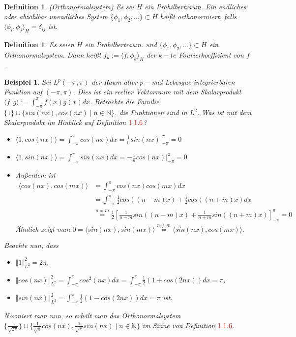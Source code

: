 \documentclass[12pt,titlepage]{article}
\newtheorem{definition}[zahl]{Definition}
\newtheorem{bsp}[zahl]{Beispiel}
\numberwithin{equation}{section}
\begin{document}
\begin{definition}{(Orthonormalsystem)}
Es sei $H$ ein Prähilbertraum. Ein endliches oder abzählbar unendliches System $\{\phi_1,\phi_2,\ldots\}\subset H$ heißt orthonormiert, falls $\langle \phi_i,\phi_j \rangle_H= \delta_{ij}$ ist.
\end{definition}
\begin{definition}
Es seien $H$ ein Prähilbertraum. und $\{\phi_1,\phi_2,\ldots\}\subset H$ ein Orthonormalsystem. Dann heißt $f_k:=\langle f, \phi_k\rangle_H$ der $k-te$ Fourierkoeffizient von $f$.
\end{definition}
 \begin{bsp}
 Sei $L^p(-\pi, \pi)$ der Raum aller $p-$mal Lebesgue-integrierbaren Funktion auf $(-\pi,\pi)$. Dies ist ein reeller Vektorraum mit dem Skalarprodukt $\langle f, g\rangle:=\int_{-\pi}^\pi f(x)g(x)dx$. Betrachte die Familie
 $\{1\} \cup \{sin(nx),cos(nx)\mid n \in \mathbb{N}\}$. die Funktionen sind in $L^2$. Was ist mit dem Skalarprodukt im Hinblick auf Definition $\textcolor{red}{1.1.6}$?
 \begin{itemize}
 \item $\langle 1,cos(nx) \rangle=\int_{-\pi}^\pi cos(nx)dx=\frac{1}{n}sin(nx)|_{-\pi}^\pi=0$
 \item $\langle 1,sin(nx) \rangle=\int_{-\pi}^\pi sin(nx)dx=-\frac{1}{n}cos(nx)|_{-\pi}^\pi=0$
 \item Außerdem ist \begin{align*}
 \langle cos(nx),cos(mx) \rangle&=\int_{-\pi}^\pi cos(nx)cos(mx)dx\\
 &=\int_{-\pi}^\pi\frac{1}{2}cos((n-m)x)+\frac{1}{2}cos((n+m)x)dx\\
& \overset{n \neq m}{=} \frac{1}{2}[\frac{1}{n-m}sin((n-m)x)+\frac{1}{n+m}sin((n+m)x)]_{-\pi}^\pi=0
 \end{align*}
 Ähnlich zeigt man $0=\langle sin(nx), sin(mx)\rangle \overset{n\neq m }{=} \langle sin(nx),cos(mx)\rangle.$
 \end{itemize}
 Beachte nun, dass
 \begin{itemize}
\item $\Vert 1 \Vert_{L^2}^2=2\pi $,
 \item $\Vert cos(nx) \Vert_{L^2}^2=\int_{-\pi}^\pi cos^2(nx)dx=\int_{-\pi}^\pi \frac{1}{2}(1+cos(2nx))dx =\pi$,
 \item  $\Vert sin(nx) \Vert_{L^2}^2=\int_{-\pi}^\pi \frac{1}{2}(1-cos(2nx))dx =\pi$ ist.
 \end{itemize} 
 Normiert man nun, so erhält man das Orthonormalsystem $\{\frac{1}{\sqrt{2\pi}}\}\cup \{\frac{1}{\sqrt{\pi}}cos(nx),\frac{1}{\sqrt{\pi}}sin(nx)\mid n \in \mathbb{N}\}$ im Sinne von Definition $\textcolor{red}{1.1.6}$.
 \end{bsp}
\end{document}
